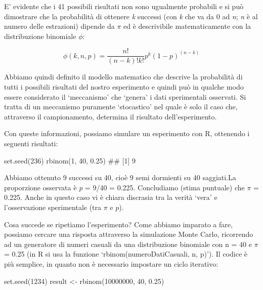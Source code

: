 \documentclass[a4paper,12pt,oneside]{book}
\newenvironment{Shaded}{}{}
\newcommand{\KeywordTok}[1]{#1}
\newcommand{\DecValTok}[1]{#1}
\newcommand{\FloatTok}[1]{#1}
\newcommand{\StringTok}[1]{#1}
\newcommand{\CommentTok}[1]{#1}
\newcommand{\NormalTok}[1]{#1}
\begin{document}
E' evidente che i 41 possibili risultati non sono ugualmente probabili e si può dimostrare che la probabilità di ottenere \emph{k} successi (con \emph{k} che va da 0 ad \emph{n}; \emph{n} è al numero delle estrazioni) dipende da \(\pi\) ed è descrivibile matematicamente con la distribuzione binomiale \(\phi\):

\[\phi(k, n, p) = \frac{n!}{(n-k)!k!} p^k (1 - p)^{(n-k)}\]

Abbiamo quindi definito il modello matematico che descrive la probabilità di tutti i possibili risultati del nostro esperimento e quindi può in qualche modo essere considerato il `meccanismo' che `genera' i dati sperimentali osservati. Si tratta di un meccanismo puramente `stocastico' nel quale è solo il caso che, attraverso il campionamento, determina il risultato dell'esperimento.

Con queste informazioni, possiamo simulare un esperimento con R, ottenendo i seguenti risultati:

\begin{Shaded}
\begin{Highlighting}[]
\KeywordTok{set.seed}\NormalTok{(}\DecValTok{236}\NormalTok{)}
\KeywordTok{rbinom}\NormalTok{(}\DecValTok{1}\NormalTok{, }\DecValTok{40}\NormalTok{, }\FloatTok{0.25}\NormalTok{)}
\CommentTok{## [1] 9}
\end{Highlighting}
\end{Shaded}

Abbiamo ottenuto 9 successi su 40, cioè 9 semi dormienti su 40 saggiati.La proporzione osservata è \emph{p} = 9/40 = 0.225. Concludiamo (stima puntuale) che \(\pi\) = 0.225. Anche in questo caso vi è chiara discrasia tra la verità `vera' e l'osservazione sperimentale (tra \(\pi\) e \(p\)).

Cosa succede se ripetiamo l'esperimento? Come abbiamo imparato a fare, possiamo cercare una risposta attraverso la simulazione Monte Carlo, ricorrendo ad un generatore di numeri casuali da una distribuzione binomiale con n = 40 e \(\pi\) = 0.25 (in R si usa la funzione `rbinom(numeroDatiCasuali, n, p)'). Il codice è più semplice, in quanto non è necessario impostare un ciclo iterativo:

\begin{Shaded}
\begin{Highlighting}[]
\KeywordTok{set.seed}\NormalTok{(}\DecValTok{1234}\NormalTok{)}
\NormalTok{result <-}\StringTok{ }\KeywordTok{rbinom}\NormalTok{(}\DecValTok{10000000}\NormalTok{, }\DecValTok{40}\NormalTok{, }\FloatTok{0.25}\NormalTok{)}
\end{Highlighting}
\end{Shaded}
\end{document}
